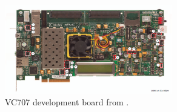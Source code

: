 %
%
%
%
%
%
%



\begin{figure}[htbp]
    \centering
    \includegraphics[width=0.65\textwidth]{./figures/vc707}
    \caption{ VC707 development board from \cite{xilinx:vc707}.
    \label{fig:vc707}}
\end{figure}

